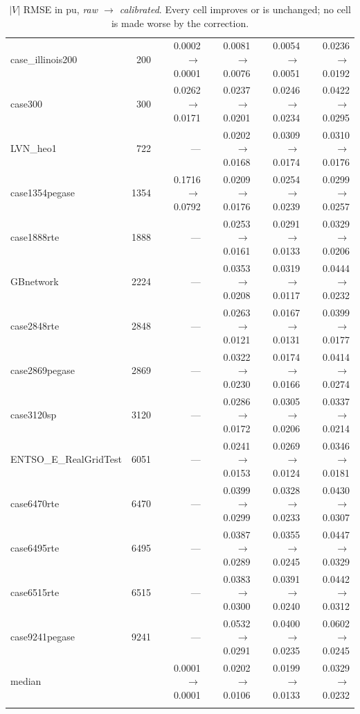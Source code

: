 \documentclass[10pt]{article}
\begin{document}
\begin{longtable}{lrrrrr}
case\_illinois200 & 200 & 0.0002$\to$0.0001 & 0.0081$\to$0.0076 & 0.0054$\to$0.0051 & 0.0236$\to$0.0192 \\
case300 & 300 & 0.0262$\to$0.0171 & 0.0237$\to$0.0201 & 0.0246$\to$0.0234 & 0.0422$\to$0.0295 \\
LVN\_heo1 & 722 & --- & 0.0202$\to$0.0168 & 0.0309$\to$0.0174 & 0.0310$\to$0.0176 \\
case1354pegase & 1354 & 0.1716$\to$0.0792 & 0.0209$\to$0.0176 & 0.0254$\to$0.0239 & 0.0299$\to$0.0257 \\
case1888rte & 1888 & --- & 0.0253$\to$0.0161 & 0.0291$\to$0.0133 & 0.0329$\to$0.0206 \\
GBnetwork & 2224 & --- & 0.0353$\to$0.0208 & 0.0319$\to$0.0117 & 0.0444$\to$0.0232 \\
case2848rte & 2848 & --- & 0.0263$\to$0.0121 & 0.0167$\to$0.0131 & 0.0399$\to$0.0177 \\
case2869pegase & 2869 & --- & 0.0322$\to$0.0230 & 0.0174$\to$0.0166 & 0.0414$\to$0.0274 \\
case3120sp & 3120 & --- & 0.0286$\to$0.0172 & 0.0305$\to$0.0206 & 0.0337$\to$0.0214 \\
ENTSO\_E\_RealGridTest & 6051 & --- & 0.0241$\to$0.0153 & 0.0269$\to$0.0124 & 0.0346$\to$0.0181 \\
case6470rte & 6470 & --- & 0.0399$\to$0.0299 & 0.0328$\to$0.0233 & 0.0430$\to$0.0307 \\
case6495rte & 6495 & --- & 0.0387$\to$0.0289 & 0.0355$\to$0.0245 & 0.0447$\to$0.0329 \\
case6515rte & 6515 & --- & 0.0383$\to$0.0300 & 0.0391$\to$0.0240 & 0.0442$\to$0.0312 \\
case9241pegase & 9241 & --- & 0.0532$\to$0.0291 & 0.0400$\to$0.0235 & 0.0602$\to$0.0245 \\
\midrule
median & & 0.0001$\to$0.0001 & 0.0202$\to$0.0106 & 0.0199$\to$0.0133 & 0.0329$\to$0.0232 \\
\bottomrule
\caption{$|V|$ RMSE in pu, \emph{raw $\to$ calibrated}.  Every cell improves or
is unchanged; no cell is made worse by the correction.}
\label{tab:vrmsecal}
\end{longtable}
\end{document}
